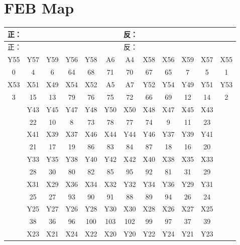 \section{FEB Map}
  \begin{longtable}{|c|c|c|c|c|c|c|c|c|c|c|c|}
    \hline
    \multicolumn{6}{|l|}{正：} & \multicolumn{6}{l|}{反：} \\ \hline
    \endfirsthead
    
    \hline
    \multicolumn{6}{|l|}{正：} & \multicolumn{6}{l|}{反：} \\ \hline
    \endhead
    
    \hline
    \endfoot
    
    \hline
    \endlastfoot
    
    Y55 & Y57 & Y59 & Y56 & Y58 & A6  & A4  & X58 & X56 & X59 & X57 & X55 \\ \hline
    0   & 4   & 6   & 64  & 68  & 71  & 70  & 67  & 65  & 7   & 5   & 1   \\ \hline
    X53 & X51 & X49 & X54 & X52 & A5  & A7  & Y52 & Y54 & Y49 & Y51 & Y53 \\ \hline
    3   & 15  & 13  & 79  & 76  & 75  & 72  & 66  & 69  & 12  & 14  & 2   \\ \hline
        & Y43 & Y45 & Y47 & Y48 & Y50 & X50 & X48 & X47 & X45 & X43 &     \\ \hline
        & 22  & 10  & 8   & 73  & 78  & 77  & 74  & 9   & 11  & 23  &     \\ \hline
        & X41 & X39 & X37 & X46 & X44 & Y44 & Y46 & Y37 & Y39 & Y41 &     \\ \hline
        & 21  & 17  & 19  & 86  & 83  & 84  & 87  & 18  & 16  & 20  &     \\ \hline
        & Y33 & Y35 & Y38 & Y40 & Y42 & X42 & X40 & X38 & X35 & X33 &     \\ \hline
        & 28  & 30  & 80  & 82  & 85  & 95  & 92  & 81  & 31  & 29  &     \\ \hline
        & X31 & X29 & X36 & X34 & X32 & Y32 & Y34 & Y36 & Y29 & Y31 &     \\ \hline
        & 25  & 27  & 93  & 90  & 91  & 88  & 89  & 94  & 26  & 24  &     \\ \hline
        & Y25 & Y27 & Y26 & Y28 & Y30 & X30 & X28 & X26 & X27 & X25 &     \\ \hline
        & 38  & 36  & 96  & 100 & 103 & 102 & 99  & 97  & 37  & 39  &     \\ \hline
        & X23 & X21 & X24 & X22 & X20 & Y20 & Y22 & Y24 & Y21 & Y23 &     \\ \hline

\end{longtable}
